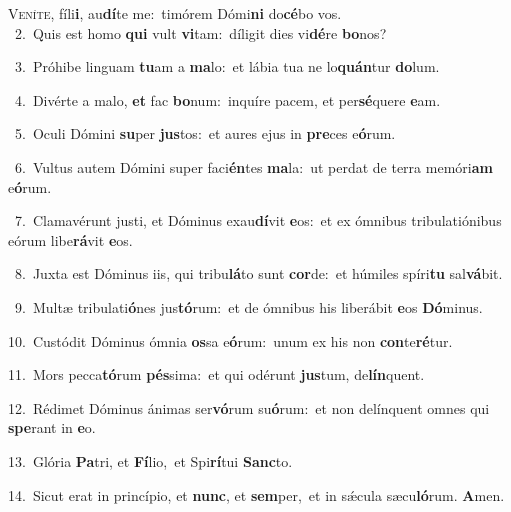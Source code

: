 \lettrine{\initial\textcolor{\initialcolor}{V}}{eníte,} fíli\-\textbf{i}\-, au\-\textbf{dí}\-te me:~\star timórem Dómi\textbf{ni} do\-\textbf{cé}\-bo vos.\\
{\numbfont\textcolor{\numbcolor}{~2.}}~Quis est homo \textbf{qui} vult \textbf{vi}\-tam:~\star díligit dies vi\-\textbf{dé}\-re \textbf{bo}\-nos?\par
{\numbfont\textcolor{\numbcolor}{~3.}}~Próhibe linguam \textbf{tu}\-am a \textbf{ma}\-lo:~\star et lábia tua ne lo\-\textbf{quán}\-tur \textbf{do}\-lum.\par
{\numbfont\textcolor{\numbcolor}{~4.}}~Divérte a malo, \textbf{et} fac \textbf{bo}\-num:~\star inquíre pacem, et per\-\textbf{sé}\-quere \textbf{e}\-am.\par
{\numbfont\textcolor{\numbcolor}{~5.}}~Oculi Dómini \textbf{su}\-per \textbf{jus}\-tos:~\star et aures ejus in \textbf{pre}\-ces e\-\textbf{ó}\-rum.\par
{\numbfont\textcolor{\numbcolor}{~6.}}~Vultus autem Dómini super faci\-\textbf{én}\-tes \textbf{ma}\-la:~\star ut perdat de terra memóri\textbf{am} e\-\textbf{ó}\-rum.\par
{\numbfont\textcolor{\numbcolor}{~7.}}~Clamavérunt justi, et Dóminus exau\-\textbf{dí}\-vit \textbf{e}\-os:~\star et ex ómnibus tribulatiónibus eórum libe\-\textbf{rá}\-vit \textbf{e}\-os.\par
{\numbfont\textcolor{\numbcolor}{~8.}}~Juxta est Dóminus iis, qui tribu\-\textbf{lá}\-to sunt \textbf{cor}\-de:~\star et húmiles spíri\textbf{tu} sal\-\textbf{vá}\-bit.\par
{\numbfont\textcolor{\numbcolor}{~9.}}~Multæ tribulati\-\textbf{ó}\-nes jus\-\textbf{tó}\-rum:~\star et de ómnibus his liberábit \textbf{e}\-os \textbf{Dó}\-minus.\par
{\numbfont\textcolor{\numbcolor}{10.}}~Custódit Dóminus ómnia \textbf{os}\-sa e\-\textbf{ó}\-rum:~\star unum ex his non \textbf{con}\-te\-\textbf{ré}\-tur.\par
{\numbfont\textcolor{\numbcolor}{11.}}~Mors pecca\-\textbf{tó}\-rum \textbf{pés}\-sima:~\star et qui odérunt \textbf{jus}\-tum, de\-\textbf{lín}\-quent.\par
{\numbfont\textcolor{\numbcolor}{12.}}~Rédimet Dóminus ánimas ser\-\textbf{vó}\-rum su\-\textbf{ó}\-rum:~\star et non delínquent omnes qui \textbf{spe}\-rant in \textbf{e}\-o.\par
{\numbfont\textcolor{\numbcolor}{13.}}~Glória \textbf{Pa}\-tri, et \textbf{Fí}\-lio,~\star et Spi\-\textbf{rí}\-tui \textbf{Sanc}\-to.\par
{\numbfont\textcolor{\numbcolor}{14.}}~Sicut erat in princípio, et \textbf{nunc}\-, et \textbf{sem}\-per,~\star et in sǽcula sæcu\-\textbf{ló}\-rum. \textbf{A}\-men.\par
